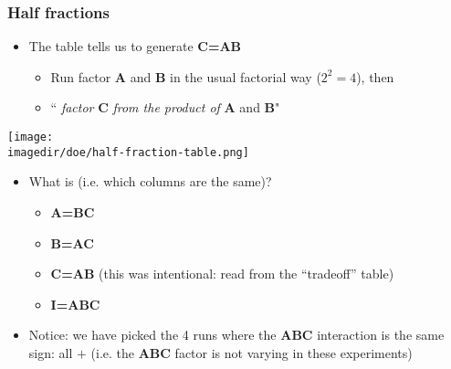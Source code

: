 \begin{frame}\frametitle{Half fractions}
	\begin{itemize}
		\item	The table tells us to generate \textbf{C=AB}
		\begin{itemize}
			\item	Run factor \textbf{A} and \textbf{B} in the usual factorial way ($2^2 = 4$), then
			\item	``\emph{{\color{purple}{generate}} factor} \textbf{C} \emph{from the product of} \textbf{A} and \textbf{B}"
		\end{itemize}
	\end{itemize}
	\begin{center}
		\texttt{[image: \\imagedir/doe/half-fraction-table.png]}
	\end{center}
	\begin{itemize}
		\item	What is {\color{purple}{confounded}} (i.e. which columns are the same)?
		\begin{itemize}
			\item	\textbf{A=BC}
			\item	\textbf{B=AC}
			\item	\textbf{C=AB} (this was intentional: read from the ``tradeoff'' table)
			\item	\textbf{I=ABC}
		\end{itemize}
	\end{itemize}
	\begin{itemize}
		\item	Notice: we have picked the 4 runs where the \textbf{ABC} interaction is the same sign: all $+$ (i.e. the \textbf{ABC} factor is not varying in these experiments)
	\end{itemize}
\end{frame}

